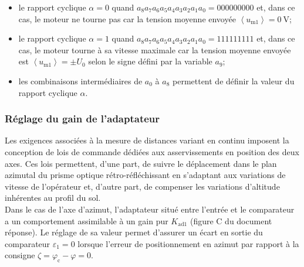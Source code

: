 \begin{itemize}
  \item le rapport cyclique $\alpha=0$ quand $a_{8} a_{7} a_{6} a_{5} a_{4} a_{3} a_{2} a_{1} a_{0}=000000000$ et, dans ce cas, le moteur ne tourne pas car la tension moyenne envoyée $\left\langle u_{\mathrm{m} 1}\right\rangle=0 \mathrm{~V}$;
  \item le rapport cyclique $\alpha=1$ quand $a_{8} a_{7} a_{6} a_{5} a_{4} a_{3} a_{2} a_{1} a_{0}=111111111$ et, dans ce cas, le moteur tourne à sa vitesse maximale car la tension moyenne envoyée est $\left\langle u_{\mathrm{m} 1}\right\rangle= \pm U_{0}$ selon le signe défini par la variable $a_{9}$;
  \item les combinaisons intermédiaires de $a_{0}$ à $a_{8}$ permettent de définir la valeur du rapport cyclique $\alpha$.
\end{itemize}

\ifprof
\begin{corrige}
\end{corrige}
\else
\fi


\subsubsection{Réglage du gain de l'adaptateur}
Les exigences associées à la mesure de distances variant en continu imposent la conception de lois de commande dédiées aux asservissements en position des deux axes. Ces lois permettent, d'une part, de suivre le déplacement dans le plan azimutal du prisme optique rétro-réfléchissant en s'adaptant aux variations de vitesse de l'opérateur et, d'autre part, de compenser les variations d'altitude inhérentes au profil du sol.\\
Dans le cas de l'axe d'azimut, l'adaptateur situé entre l'entrée et le comparateur a un comportement assimilable à un gain pur $K_{\mathrm{ad} 1}$ (figure C du document réponse). Le réglage de sa valeur permet d'assurer un écart en sortie du comparateur $\varepsilon_{1}=0$ lorsque l'erreur de positionnement en azimut par rapport à la consigne $\zeta=\varphi_{\mathrm{c}}-\varphi=0$.\\

